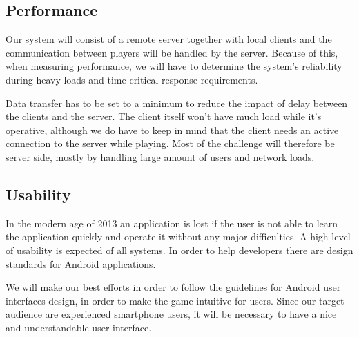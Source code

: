 \subsection{Performance}
Our system will consist of a remote server together with local clients and the communication between players will be handled by the server. Because of this, when measuring performance, we will have to determine the system's reliability during heavy loads and time-critical response requirements.

Data transfer has to be set to a minimum to reduce the impact of delay between
the clients and the server. The client itself won't have much load while it's
operative, although we do have to keep in mind that the client needs an
active connection to the server while playing. Most of the challenge will
therefore be server side, mostly by handling large amount of users and network
loads.

\subsection{Usability} 
In the modern age of 2013 an application is lost if the user is not able to learn the application quickly and operate it without any major difficulties. A high level of usability is expected of all systems. In order to help developers there are design standards for Android applications\cite{website:android}.

We will make our best efforts in order to follow the guidelines for Android user interfaces design, in order to make the game intuitive for users. Since our target audience are experienced smartphone users, it will be necessary to have a nice and understandable user interface.
